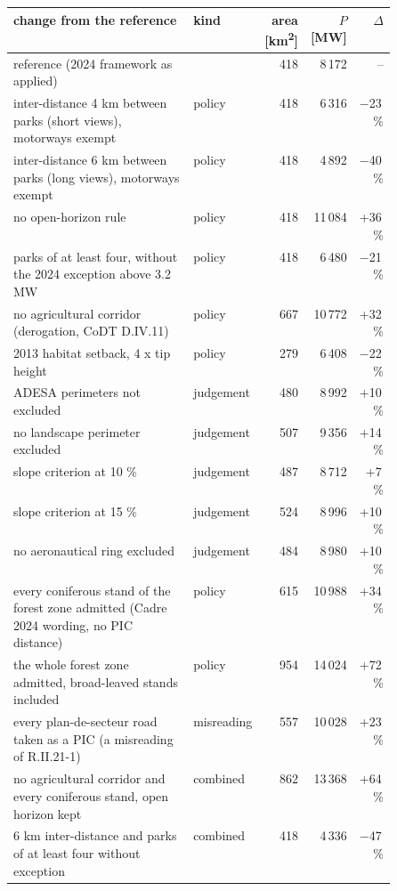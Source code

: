 \begin{tabular}{p{0.50\linewidth}lrrr}
\toprule
change from the reference & kind & area [\si{\square\kilo\metre}] & $P$ [\si{\mega\watt}] & $\Delta$ \\
\midrule
reference (2024 framework as applied) &  & 418 & 8\,172 & -- \\
\midrule
inter-distance 4 km between parks (short views), motorways exempt & policy & 418 & 6\,316 & $-$23\,\% \\
inter-distance 6 km between parks (long views), motorways exempt & policy & 418 & 4\,892 & $-$40\,\% \\
no open-horizon rule & policy & 418 & 11\,084 & +36\,\% \\
parks of at least four, without the 2024 exception above 3.2 MW & policy & 418 & 6\,480 & $-$21\,\% \\
no agricultural corridor (derogation, CoDT D.IV.11) & policy & 667 & 10\,772 & +32\,\% \\
2013 habitat setback, 4 x tip height & policy & 279 & 6\,408 & $-$22\,\% \\
\midrule
ADESA perimeters not excluded & judgement & 480 & 8\,992 & +10\,\% \\
no landscape perimeter excluded & judgement & 507 & 9\,356 & +14\,\% \\
slope criterion at 10 \% & judgement & 487 & 8\,712 & +7\,\% \\
slope criterion at 15 \% & judgement & 524 & 8\,996 & +10\,\% \\
no aeronautical ring excluded & judgement & 484 & 8\,980 & +10\,\% \\
\midrule
every coniferous stand of the forest zone admitted (Cadre 2024 wording, no PIC distance) & policy & 615 & 10\,988 & +34\,\% \\
the whole forest zone admitted, broad-leaved stands included & policy & 954 & 14\,024 & +72\,\% \\
\midrule
every plan-de-secteur road taken as a PIC (a misreading of R.II.21-1) & misreading & 557 & 10\,028 & +23\,\% \\
\midrule
no agricultural corridor and every coniferous stand, open horizon kept & combined & 862 & 13\,368 & +64\,\% \\
6 km inter-distance and parks of at least four without exception & combined & 418 & 4\,336 & $-$47\,\% \\
\bottomrule
\end{tabular}